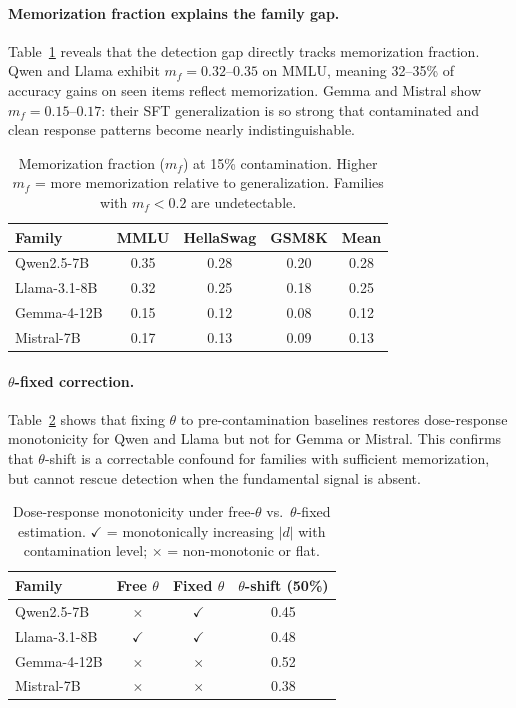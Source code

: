 \documentclass[11pt,a4paper]{article}
\begin{document}
\paragraph{Memorization fraction explains the family gap.}
Table~\ref{tab:memo_frac} reveals that the detection gap directly tracks memorization fraction.
Qwen and Llama exhibit $m_f = 0.32$--$0.35$ on MMLU, meaning 32--35\% of accuracy gains on seen items reflect memorization.
Gemma and Mistral show $m_f = 0.15$--$0.17$: their SFT generalization is so strong that contaminated and clean response patterns become nearly indistinguishable.

\begin{table}[t]
\centering
\small
\caption{Memorization fraction ($m_f$) at 15\% contamination. Higher $m_f$ = more memorization relative to generalization. Families with $m_f < 0.2$ are undetectable.}
\label{tab:memo_frac}
\begin{tabular}{lcccc}
\toprule
\textbf{Family} & \textbf{MMLU} & \textbf{HellaSwag} & \textbf{GSM8K} & \textbf{Mean} \\
\midrule
Qwen2.5-7B & 0.35 & 0.28 & 0.20 & 0.28 \\
Llama-3.1-8B & 0.32 & 0.25 & 0.18 & 0.25 \\
Gemma-4-12B & 0.15 & 0.12 & 0.08 & 0.12 \\
Mistral-7B & 0.17 & 0.13 & 0.09 & 0.13 \\
\bottomrule
\end{tabular}
\end{table}

\paragraph{$\theta$-fixed correction.}
Table~\ref{tab:theta_fixed} shows that fixing $\theta$ to pre-contamination baselines restores dose-response monotonicity for Qwen and Llama but not for Gemma or Mistral.
This confirms that $\theta$-shift is a correctable confound for families with sufficient memorization, but cannot rescue detection when the fundamental signal is absent.

\begin{table}[t]
\centering
\small
\caption{Dose-response monotonicity under free-$\theta$ vs.\ $\theta$-fixed estimation. $\checkmark$ = monotonically increasing $|d|$ with contamination level; $\times$ = non-monotonic or flat.}
\label{tab:theta_fixed}
\begin{tabular}{lccc}
\toprule
\textbf{Family} & \textbf{Free $\theta$} & \textbf{Fixed $\theta$} & $\theta$\textbf{-shift (50\%)} \\
\midrule
Qwen2.5-7B & $\times$ & $\checkmark$ & 0.45 \\
Llama-3.1-8B & $\checkmark$ & $\checkmark$ & 0.48 \\
Gemma-4-12B & $\times$ & $\times$ & 0.52 \\
Mistral-7B & $\times$ & $\times$ & 0.38 \\
\bottomrule
\end{tabular}
\end{table}
\end{document}
